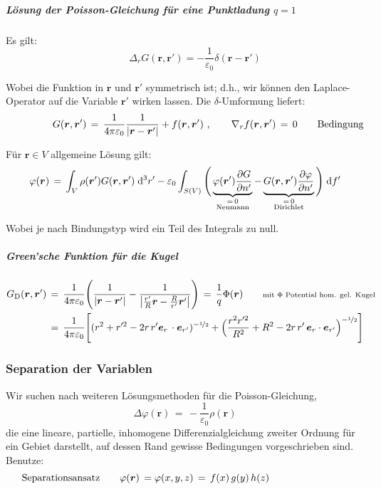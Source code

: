 \documentclass[titlepage,11pt,a4paper,ngerman]{report}
\newcommand{\dd}{\mathrm{d}}
\renewcommand{\vec}[1]{\boldsymbol{#1}}
\renewcommand{\epsilon}{\varepsilon}
\renewcommand{\paragraph}[1]{\subsubsection{#1}}
\newcommand{\eq}{\,=\,}
\begin{document}
\subparagraph{Lösung der Poisson-Gleichung für eine Punktladung $q = 1$} Es gilt:
\[\qquad \Delta_r G(\vec{r},\vec{r}')=-\frac{1}{\epsilon_0}\delta(\vec{r}-\vec{r}')\]

Wobei die Funktion in $\vec{r}$ und $\vec{r}'$ symmetrisch ist; d.h., wir können den Laplace-Operator auf die Variable $\vec{r}'$ wirken lassen. Die $\delta$-Umformung liefert:
\[G(\vec{r},\vec{r}')\,=\,\frac{1}{4\pi\epsilon_0}\frac{1}{\left|\vec{r}-\vec{r}'\right|}+f(\vec{r},\vec{r}')\ ,\qquad \nabla_r f(\vec{r},\vec{r}')\,=\,0\qquad\rlap{Bedingung}\]

Für $\vec{r}\in V$ allgemeine Lösung gilt:
\[\varphi(\vec{r})\,=\,\int_V\rho(\vec{r}')G(\vec{r},\vec{r}')\;\dd^3r'-\epsilon_0\int_{S(V)}\Bigg(\underbrace{\varphi(\vec{r}')\frac{\partial G}{\partial n'}}_{\mathclap{\substack{{=\,0}\\{\text{Neumann}}}}}-\underbrace{G(\vec{r},\vec{r}')\frac{\partial\varphi}{\partial n'}}_{\mathclap{\substack{{=\,0}\\{\text{Dirichlet}}}}}\Bigg)\;\dd f'\]

Wobei je nach Bindungstyp wird ein Teil des Integrals zu null.

\subparagraph{Green'sche Funktion für die Kugel}
\begin{align*}
G_\mathrm{D}(\vec{r},\vec{r}')\,&=\,\frac{1}{4\pi\epsilon_0}\Bigg(\frac{1}{\left|\vec{r}-\vec{r}'\right|}-\frac{1}{\left|\frac{r'}{R}\vec{r}-\frac{R}{r'}\vec{r}'\right|}\Bigg)\eq \frac{1}{q}\Phi(\vec{r})\qquad\rlap{\scriptsize{mit $\Phi$ Potential hom. gel. Kugel}}\\
&=\,\frac{1}{4\pi\epsilon_0}\Bigg[ (r^2+r'^2-2r\,r'\vec{e}_r\,\cdot\vec{e}_{r'})^{-\nicefrac{1}{2}}+\Big( \frac{r^2r'^2}{R^2}+R^2-2r\,r'\,\vec{e}_r\cdot\vec{e}_{r'} \Big)^{-\nicefrac{1}{2}} \Bigg]
\end{align*}

\paragraph{Separation der Variablen}
Wir suchen nach weiteren Lösungsmethoden für die Poisson-Gleichung,
\[\Delta\varphi(\vec{r})\,=\,-\frac{1}{\epsilon_0}\rho(\vec{r})\]
die eine lineare, partielle, inhomogene Differenzialgleichung zweiter Ordnung für ein Gebiet darstellt, auf dessen Rand gewisse Bedingungen vorgeschrieben sind. Benutze:
\hfill\break
\[\llap{Separationsansatz}\qquad\varphi(\vec{r})\,=\varphi(x,y,z)\,=\,f(x)\,g(y)\,h(z)\]

\pagebreak
\end{document}
